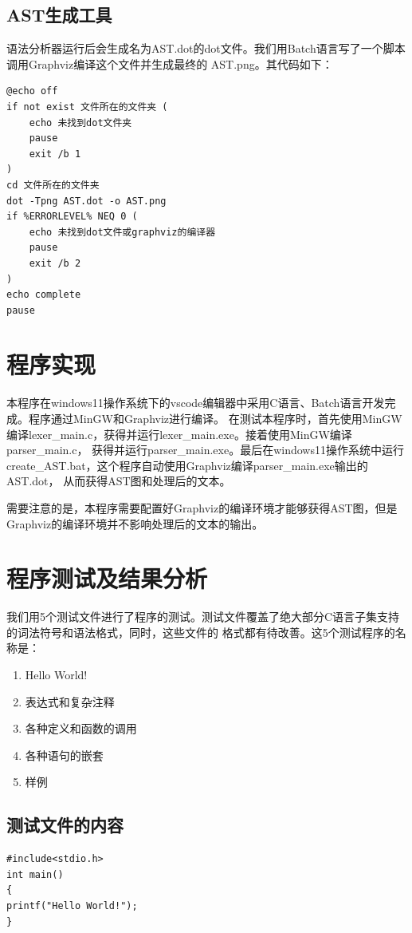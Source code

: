 \documentclass[supercite]{Experimental_Report}
\theoremstyle{definition}
\begin{document}
\subsection{AST生成工具}
语法分析器运行后会生成名为AST.dot的dot文件。我们用Batch语言写了一个脚本调用Graphviz编译这个文件并生成最终的
AST.png。其代码如下：
\begin{lstlisting}[title=AST生成工具,frame=none]
@echo off
if not exist 文件所在的文件夹 (
    echo 未找到dot文件夹
    pause
    exit /b 1
) 
cd 文件所在的文件夹
dot -Tpng AST.dot -o AST.png 
if %ERRORLEVEL% NEQ 0 (
    echo 未找到dot文件或graphviz的编译器
    pause
    exit /b 2
)
echo complete
pause
\end{lstlisting}

\newpage

\section{程序实现}

本程序在windows11操作系统下的vscode编辑器中采用C语言、Batch语言开发完成。程序通过MinGW和Graphviz进行编译。
在测试本程序时，首先使用MinGW编译lexer\_main.c，获得并运行lexer\_main.exe。接着使用MinGW编译parser\_main.c，
获得并运行parser\_main.exe。最后在windows11操作系统中运行create\_AST.bat，这个程序自动使用Graphviz编译parser\_main.exe输出的AST.dot，
从而获得AST图和处理后的文本。

需要注意的是，本程序需要配置好Graphviz的编译环境才能够获得AST图，但是Graphviz的编译环境并不影响处理后的文本的输出。

\section{程序测试及结果分析}
我们用5个测试文件进行了程序的测试。测试文件覆盖了绝大部分C语言子集支持的词法符号和语法格式，同时，这些文件的
格式都有待改善。这5个测试程序的名称是：
\begin{enumerate}
	\item Hello World!
	\item 表达式和复杂注释
	\item 各种定义和函数的调用
	\item 各种语句的嵌套
	\item 样例
\end{enumerate}
\subsection{测试文件的内容}
\begin{lstlisting}[title=Hello World!,frame=none]
#include<stdio.h>
int main()
{
printf("Hello World!");
}
\end{lstlisting}
\end{document}
